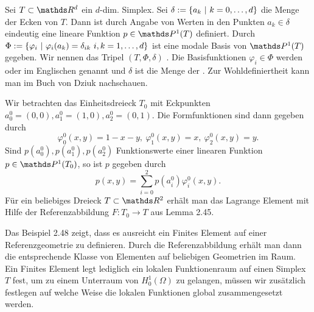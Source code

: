 Sei $T\subset\R^d$ ein $d$-dim. Simplex.
Sei $\delta := \left\{a_k~|~k=0, \dots ,d\right\}$ die Menge der Ecken von $T$.
Dann ist durch Angabe von Werten in den Punkten $a_k\in \delta$ eindeutig eine lineare Funktion $p\in \Pw^1(T)$ definiert.
Durch $\Phi := \left\{\varphi_i~|~\varphi_i(a_k)=\delta_{ik}~i,k=1, \dots ,d\right\}$ ist eine modale Basis von $\Pw^1(T)$ gegeben.
Wir nennen das Tripel $(T,\Phi,\delta)$ .
Die Basisfunktionen $\varphi_i\in\Phi$ werden  oder im Englischen  genannt und $\delta$ ist die Menge der .
Zur Wohldefiniertheit kann man im Buch von Dziuk nachschauen.

Wir betrachten das Einheitsdreieck $T_0$ mit Eckpunkten $a_0^0=(0,0),a_1^0=(1,0),a_2^0=(0,1)$.
Die Formfunktionen sind dann gegeben durch
\[
\varphi_0^0(x,y)= 1-x-y,~\varphi_1^0(x,y) = x,~\varphi_2^0(x,y) = y.
\]
Sind $p(a_0^0),p(a_1^0),p(a_2^0)$ Funktionswerte einer linearen Funktion $p\in\Pw^1(T_0)$, so ist $p$ gegeben durch
\[
p(x,y) = \sum_{i=0}^{2} p(a_i^0)\varphi_i^0(x,y).
\]
Für ein beliebiges Dreieck $T\subset\R^2$ erhält man das Lagrange Element mit Hilfe der Referenzabbildung $F:T_0\to T$ aus Lemma 2.45.

Das Beispiel 2.48 zeigt, dass es ausreicht ein Finites Element auf einer Referenzgeometrie zu definieren.
Durch die Referenzabbildung erhält man dann die entsprechende Klasse von Elementen auf beliebigen Geometrien im Raum.\\

Ein Finites Element legt lediglich ein lokalen Funktionenraum auf einen Simplex $T$ fest, um zu einem Unterraum von $H^1_0(\Omega)$ zu gelangen, müssen wir zusätzlich festlegen auf welche Weise die lokalen Funktionen global zusammengesetzt werden.

